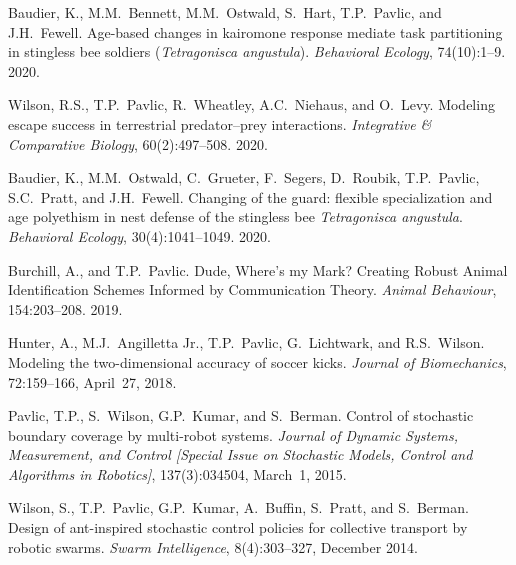 \documentclass[10pt]{article}           %
\begin{document}
\begin{bibenum}
    \item Baudier, K., M.M.~Bennett, M.M.~Ostwald, S.~Hart, T.P.~Pavlic,
        and J.H.~Fewell. Age-based changes in kairomone response mediate
        task partitioning in stingless bee soldiers (\emph{Tetragonisca
        angustula}). \emph{Behavioral Ecology}, 74(10):1--9. 2020.

    \item Wilson, R.S., T.P.~Pavlic, R.~Wheatley, A.C.~Niehaus, and
        O.~Levy. Modeling escape success in terrestrial predator--prey
        interactions.
        \emph{Integrative \& Comparative Biology}, 60(2):497--508. 2020.

    \item Baudier, K., M.M.~Ostwald, C.~Grueter, F.~Segers, D.~Roubik,
        T.P.~Pavlic, S.C.~Pratt, and J.H.~Fewell. Changing of the guard:
        flexible specialization and age polyethism in nest defense of
        the stingless bee \emph{Tetragonisca angustula}.
        \emph{Behavioral Ecology}, 30(4):1041--1049. 2020.

    \item Burchill, A., and T.P.~Pavlic. Dude, Where's my Mark? Creating
        Robust Animal Identification Schemes Informed by Communication
        Theory. \emph{Animal Behaviour}, 154:203--208. 2019.

    \item Hunter, A., M.J.~Angilletta Jr., T.P.~Pavlic, G.~Lichtwark,
        and R.S.~Wilson. Modeling the two-dimensional accuracy of soccer
        kicks. \emph{Journal of Biomechanics}, 72:159--166, April~27,
        2018. 

    \item Pavlic, T.P., S.~Wilson, G.P.~Kumar, and S.~Berman. Control of
        stochastic boundary coverage by multi-robot systems.
        \emph{Journal of Dynamic Systems, Measurement, and Control
        [Special Issue on Stochastic Models, Control and Algorithms
        in Robotics]}, 137(3):034504, March~1, 2015.

    \item Wilson, S., T.P.~Pavlic, G.P.~Kumar, A.~Buffin, S.~Pratt, and
        S.~Berman. Design of ant-inspired stochastic control policies
        for collective transport by robotic swarms. \emph{Swarm
        Intelligence}, 8(4):303--327, December 2014.


\end{bibenum}
\end{document}
